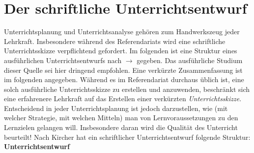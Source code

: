 \chapter{Der schriftliche Unterrichtsentwurf}\label{Entwurf}

Unterrichtsplanung und Unterrichtsanalyse geh\"{o}ren zum Handwerkszeug jeder Lehrkraft. Insbesondere w\"{a}hrend des Referendariats wird eine schriftliche Unterrichtsskizze verpflichtend gefordert. Im folgenden ist eine Struktur eines ausf\"{u}hrlichen Unterrichtsentwurfs nach $\to$ \textcite{kircherPlanungUndAnalyse2015} gegeben. Das ausf\"{u}hrliche Studium dieser Quelle sei hier dringend empfohlen. Eine verk\"{u}rzte Zusammenfassung ist im folgenden angegeben. W\"{a}hrend es im Referendariat durchaus \"{u}blich ist, eine solch ausf\"{u}hrliche Unterrichtsskizze zu erstellen und anzuwenden, beschr\"{a}nkt sich eine erfahrenere Lehrkraft auf das Erstellen einer verk\"{u}rzten \emph{Unterrichtsskizze}. Entscheidend in jeder Unterrichtsplanung ist jedoch darzustellen, wie (mit welcher Strategie, mit welchen Mitteln) man von Lernvoraussetzungen zu den Lernzielen gelangen will. Insbesondere daran wird die Qualit\"{a}t des Unterricht beurteilt! 
\mip
Nach Kircher hat ein schriftlicher Unterrichtsentwurf folgende Struktur:
\bip
\textbf{Unterrichtsentwurf} 

